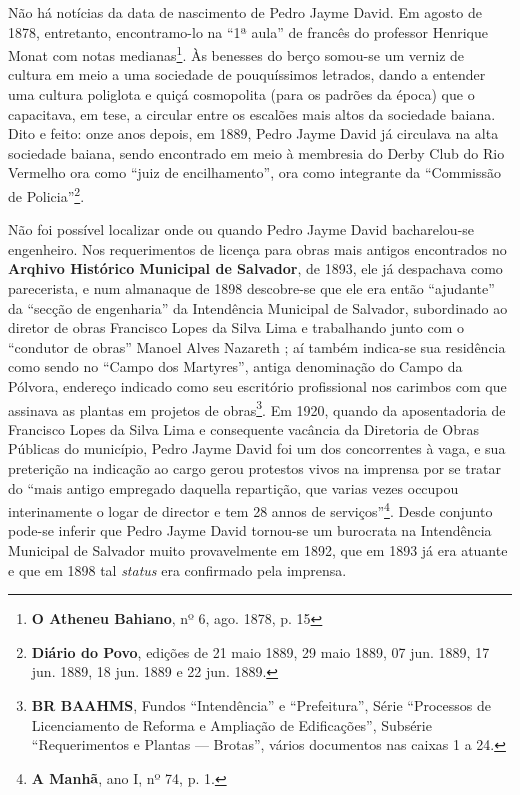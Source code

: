 Não há notícias da data de nascimento de Pedro Jayme David. Em agosto de 1878, entretanto, encontramo-lo na ``1ª aula'' de francês do professor Henrique Monat com notas medianas\footnote{\textbf{O Atheneu Bahiano}, nº 6, ago. 1878, p. 15}. Às benesses do berço somou-se um verniz de cultura em meio a uma sociedade de pouquíssimos letrados, dando a entender uma cultura poliglota e quiçá cosmopolita (para os padrões da época) que o capacitava, em tese, a circular entre os escalões mais altos da sociedade baiana. Dito e feito: onze anos depois, em 1889, Pedro Jayme David já circulava na alta sociedade baiana, sendo encontrado em meio à membresia do Derby Club do Rio Vermelho ora como ``juiz de encilhamento'', ora como integrante da ``Commissão de Policia''\footnote{\textbf{Diário do Povo}, edições de 21 maio 1889, 29 maio 1889, 07 jun. 1889, 17 jun. 1889, 18 jun. 1889 e 22 jun. 1889.}. 

Não foi possível localizar onde ou quando Pedro Jayme David bacharelou-se engenheiro. Nos requerimentos de licença para obras mais antigos encontrados no \textbf{Arqhivo Histórico Municipal de Salvador}, de 1893, ele já despachava como parecerista, e num almanaque de 1898 descobre-se que ele era então ``ajudante'' da ``secção de engenharia'' da Intendência Municipal de Salvador, subordinado ao diretor de obras Francisco Lopes da Silva Lima e trabalhando junto com o ``condutor de obras'' Manoel Alves Nazareth \cite[p.~278]{reis_almanak_1898}; aí também indica-se sua residência como sendo no ``Campo dos Martyres'', antiga denominação do Campo da Pólvora, endereço indicado como seu escritório profissional nos carimbos com que assinava as plantas em projetos de obras\footnote{\textbf{BR BAAHMS}, Fundos ``Intendência'' e ``Prefeitura'', Série ``Processos de Licenciamento de Reforma e Ampliação de Edificações'', Subsérie ``Requerimentos e Plantas --- Brotas'', vários documentos nas caixas 1 a 24.}. Em 1920, quando da aposentadoria de Francisco Lopes da Silva Lima e consequente vacância da Diretoria de Obras Públicas do município, Pedro Jayme David foi um dos concorrentes à vaga, e sua preterição na indicação ao cargo gerou protestos vivos na imprensa por se tratar do ``mais antigo empregado daquella repartição, que varias vezes occupou interinamente o logar de director e tem 28 annos de serviços''\footnote{\textbf{A Manhã}, ano I, nº 74, p. 1.}. Desde conjunto pode-se inferir que Pedro Jayme David tornou-se um burocrata na Intendência Municipal de Salvador muito provavelmente em 1892, que em 1893 já era atuante e que em 1898 tal \textit{status} era confirmado pela imprensa.

